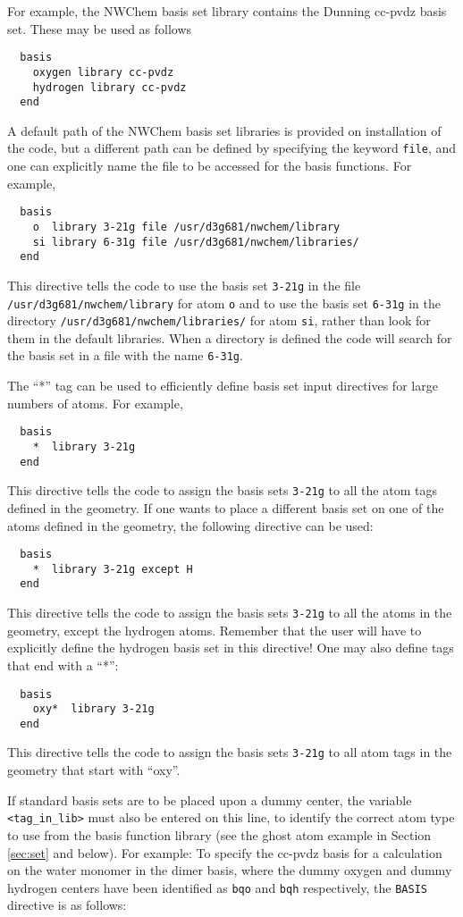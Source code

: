 For example, the NWChem basis set library contains the Dunning cc-pvdz
basis set.  These may be used as follows
\begin{verbatim}
  basis
    oxygen library cc-pvdz
    hydrogen library cc-pvdz
  end
\end{verbatim}

A default path of the NWChem basis set libraries is provided on installation 
of the code, but a different path can be defined by specifying the keyword 
\verb+file+, and one can explicitly name the file to be accessed
for the basis functions. For example,
\begin{verbatim}
  basis
    o  library 3-21g file /usr/d3g681/nwchem/library
    si library 6-31g file /usr/d3g681/nwchem/libraries/
  end
\end{verbatim}
This directive tells the code to use the basis set \verb+3-21g+ in
the file {\tt /usr/\-d3g681/\-nwchem/\-library} for atom \verb+o+ and
to use the basis set \verb+6-31g+ in the directory 
{\tt /usr/\-d3g681/\-nwchem/\-libraries/} for atom \verb+si+, rather 
than look for them in the default libraries. When a directory is defined 
the code will search for the basis set in a file with the name {\tt 6-31g}.

The ``*'' tag can be used to efficiently define basis set input directives 
for large numbers of atoms. For example,
\begin{verbatim}
  basis
    *  library 3-21g
  end
\end{verbatim}
This directive tells the code to assign the basis sets \verb+3-21g+ to
all the atom tags defined in the geometry. If one wants to place a
different basis set on one of the atoms defined in the geometry, the 
following directive can be used:
\begin{verbatim}
  basis
    *  library 3-21g except H
  end
\end{verbatim}
This directive tells the code to assign the basis sets \verb+3-21g+ to
all the atoms in the geometry, except the hydrogen atoms. Remember that 
the user will have to explicitly define the hydrogen basis set in this
directive! One may also define tags that end with a ``*'': 
\begin{verbatim}
  basis
    oxy*  library 3-21g 
  end
\end{verbatim}
This directive tells the code to assign the basis sets \verb+3-21g+ to 
all atom tags in the geometry that start with ``oxy''.

If standard basis sets are to be placed upon a dummy center, the
variable \verb+<tag_in_lib>+ must also be entered on this line, to
identify the correct atom type to use from the basis function library
(see the ghost atom example in Section \ref{sec:set} and below).  For
example: To specify the cc-pvdz basis for a calculation on the water
monomer in the dimer basis, where the dummy oxygen and dummy hydrogen
centers have been identified as \verb+bqo+ and \verb+bqh+
respectively, the \verb+BASIS+ directive is as follows:

